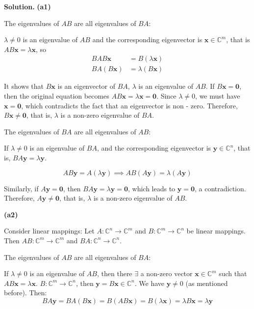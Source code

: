 \documentclass[12pt, a4paper, oneside]{ctexart}
\newenvironment{solution}{\par\noindent\textbf{Solution. }}{\par}
\begin{document}
\begin{solution}
\textbf{(a1)}
 
The eigenvalues of $AB$ are all eigenvalues of $BA$:

$\lambda \neq 0 $ is an eigenvalue of $AB$ and the corresponding eigenvector is $\mathbf{x}\in \mathbb{C}^m$, that is $AB\mathbf{x}=\lambda\mathbf{x}$, so
\begin{align*}
	BAB\mathbf{x}&= B (\lambda\mathbf{x})\\
	BA(B\mathbf{x})&=\lambda(B\mathbf{x})
\end{align*}

It shows that $B\mathbf{x}$ is an eigenvector of $BA$, $\lambda  $ is an eigenvalue of $AB$. If $ B\mathbf{x}=\mathbf{0} $, then the original equation becomes $ AB \mathbf{x}=\lambda\mathbf{x}=\mathbf{0} $. Since $ \lambda\neq0 $, we must have $ \mathbf{x}=\mathbf{0} $, which contradicts the fact that an eigenvector is non - zero. Therefore, $ B\mathbf{x}\neq\mathbf{0} $, that is, $ \lambda $ is a non-zero eigenvalue of $ BA $.

The eigenvalues of $BA$ are all eigenvalues of $AB$:

If $ \lambda\neq0 $ is an eigenvalue of $ BA $, and the corresponding eigenvector is $ \mathbf{y}\in\mathbb{C}^n $, that is, $ BA\mathbf{y}=\lambda\mathbf{y} $.

$$
AB\mathbf{y}=A(\lambda\mathbf{y})\implies AB(A\mathbf{y})=\lambda(A\mathbf{y})$$

Similarly, if $ A\mathbf{y}=\mathbf{0} $, then $ BA\mathbf{y}=\lambda\mathbf{y}=\mathbf{0} $, which leads to $ \mathbf{y}=\mathbf{0} $, a contradiction. Therefore, $ A\mathbf{y}\neq\mathbf{0} $, that is, $ \lambda $ is a non-zero eigenvalue of $ AB $.

\vspace{12pt}

\textbf{(a2)}

Consider linear mappings: Let $ A:\mathbb{C}^n\to\mathbb{C}^m $ and $ B:\mathbb{C}^m\to\mathbb{C}^n $ be linear mappings. Then $ AB:\mathbb{C}^m\to\mathbb{C}^m $ and $ BA:\mathbb{C}^n\to\mathbb{C}^n $.

The eigenvalues of $AB$ are all eigenvalues of $BA$:

If $ \lambda\neq0 $ is an eigenvalue of $ AB $, then there $\exists$ a non-zero vector $ \mathbf{x}\in\mathbb{C}^m $ such that $ AB\mathbf{x}=\lambda\mathbf{x} $. $ B:\mathbb{C}^m\to\mathbb{C}^n $, then $ \mathbf{y} = B\mathbf{x}\in\mathbb{C}^n $. We have $ \mathbf{y}\neq0 $ (as mentioned before). Then:
$$
BA\mathbf{y}=BA(B\mathbf{x})=B(AB\mathbf{x})=B(\lambda\mathbf{x})=\lambda B\mathbf{x}=\lambda\mathbf{y}
$$


\end{solution}
\end{document}
